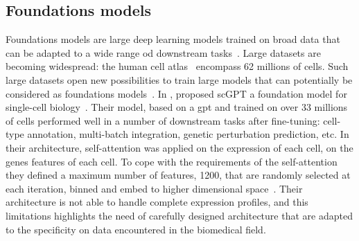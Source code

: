 \documentclass[../main.tex]{subfiles}
\begin{document}
	\subsection{Foundations models}
		Foundations models are large deep learning models trained on broad data that can be adapted to a wide range od downstream tasks~\cite{bommasani2022opportunitiesrisksfoundationmodels}.
		Large  datasets are becoming widespread: the human cell atlas~\cite{Regev2017} encompass 62 millions of cells.
		Such large datasets open new possibilities to train large models that can potentially be considered as foundations models~\cite{Moor2023}.
		In \citeyear{Cui2024}, \citeauthor{Cui2024} proposed scGPT a foundation model for single-cell biology~\cite{Cui2024}.
		Their model, based on a \gls{gpt} and trained on over 33 millions of cells performed well in a number of downstream tasks after fine-tuning: cell-type annotation, multi-batch integration, genetic perturbation prediction, etc\@.
		In their architecture, self-attention was applied on the expression of each cell, \ie{}on the genes features of each cell.
		To cope with the requirements of the self-attention they defined a maximum number of features, 1200, that are randomly selected at each iteration, binned and embed to higher dimensional space~\cite{Cui2024}.
		Their architecture is not able to handle complete expression profiles, and this limitations highlights the need of carefully designed architecture that are adapted to the specificity on data encountered in the biomedical field.
\end{document}
